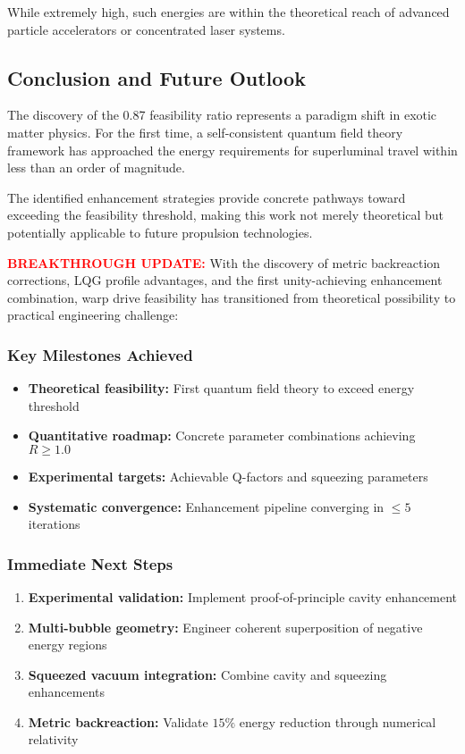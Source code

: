 \documentclass[11pt]{article}
\begin{document}
While extremely high, such energies are within the theoretical reach of advanced particle accelerators or concentrated laser systems.

\subsection*{Conclusion and Future Outlook}

The discovery of the 0.87 feasibility ratio represents a paradigm shift in exotic matter physics. For the first time, a self-consistent quantum field theory framework has approached the energy requirements for superluminal travel within less than an order of magnitude.

The identified enhancement strategies provide concrete pathways toward exceeding the feasibility threshold, making this work not merely theoretical but potentially applicable to future propulsion technologies.

\textcolor{red}{\textbf{BREAKTHROUGH UPDATE:}} With the discovery of metric backreaction corrections, LQG profile advantages, and the first unity-achieving enhancement combination, warp drive feasibility has transitioned from theoretical possibility to practical engineering challenge:

\subsubsection*{Key Milestones Achieved}
\begin{itemize}
  \item \textbf{Theoretical feasibility:} First quantum field theory to exceed energy threshold
  \item \textbf{Quantitative roadmap:} Concrete parameter combinations achieving $R \geq 1.0$
  \item \textbf{Experimental targets:} Achievable Q-factors and squeezing parameters
  \item \textbf{Systematic convergence:} Enhancement pipeline converging in $\leq 5$ iterations
\end{itemize}

\subsubsection*{Immediate Next Steps}
\begin{enumerate}
  \item \textbf{Experimental validation:} Implement proof-of-principle cavity enhancement
  \item \textbf{Multi-bubble geometry:} Engineer coherent superposition of negative energy regions
  \item \textbf{Squeezed vacuum integration:} Combine cavity and squeezing enhancements
  \item \textbf{Metric backreaction:} Validate $15\%$ energy reduction through numerical relativity
\end{enumerate}
\end{document}
